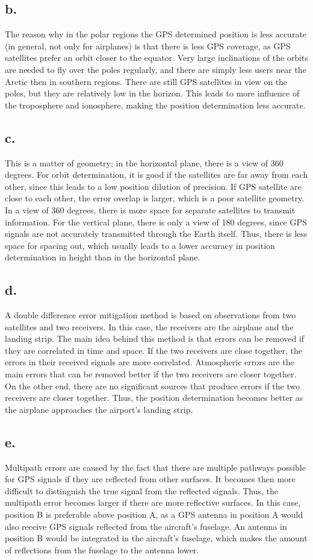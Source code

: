 \documentclass[a4paper,10pt,titlepage]{article}
\begin{document}
\subsection*{b.}
The reason why in the polar regions the GPS determined position is less accurate (in general, not only for airplanes) is that there is less GPS coverage, as GPS satellites prefer an orbit closer to the equator. Very large inclinations of the orbits are needed to fly over the poles regularly, and there are simply less users near the Arctic then in southern regions. There are still GPS satellites in view on the poles, but they are relatively low in the horizon. This leads to more influence of the troposphere and ionosphere, making the position determination less accurate.
\subsection*{c.}
This is a matter of geometry; in the horizontal plane, there is a view of 360 degrees. For orbit determination, it is good if the satellites are far away from each other, since this leads to a low position dilution of precision. If GPS satellite are close to each other, the error overlap is larger, which is a poor satellite geometry. In a view of 360 degrees, there is more space for separate satellites to transmit information. For the vertical plane, there is only a view of 180 degrees, since GPS signals are not accurately transmitted through the Earth itself. Thus, there is less space for spacing out, which usually leads to a lower accuracy in position determination in height than in the horizontal plane.
\subsection*{d.}
A double difference error mitigation method is based on observations from two satellites and two receivers. In this case, the receivers are the airplane and the landing strip. The main idea behind this method is that errors can be removed if they are correlated in time and space. If the two receivers are close together, the errors in their received signals are more correlated. Atmospheric errors are the main errors that can be removed better if the two receivers are closer together. On the other end, there are no significant sources that produce errors if the two receivers are closer together. Thus, the position determination becomes better as the airplane approaches the airport's landing strip.
\subsection*{e.}
Multipath errors are caused by the fact that there are multiple pathways possible for GPS signals if they are reflected from other surfaces. It becomes then more difficult to distinguish the true signal from the reflected signals. Thus, the multipath error becomes larger if there are more reflective surfaces. In this case, position B is preferable above position A, as a GPS antenna in position A would also receive GPS signals reflected from the aircraft's fuselage. An antenna in position B would be integrated in the aircraft's fuselage, which makes the amount of reflections from the fuselage to the antenna lower. 
\end{document}
